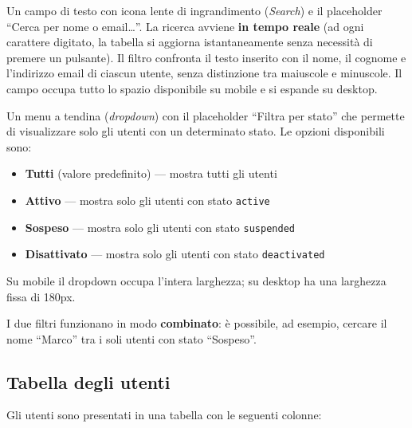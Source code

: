 \documentclass[a4paper,11pt,oneside]{book}
\begin{document}
\begin{description}[leftmargin=1.5em, style=nextline]
  \item[Campo di ricerca] Un campo di testo con icona lente di ingrandimento (\textit{Search}) e il placeholder ``Cerca per nome o email\ldots''. La ricerca avviene \textbf{in tempo reale} (ad ogni carattere digitato, la tabella si aggiorna istantaneamente senza necessit\`a di premere un pulsante). Il filtro confronta il testo inserito con il nome, il cognome e l'indirizzo email di ciascun utente, senza distinzione tra maiuscole e minuscole. Il campo occupa tutto lo spazio disponibile su mobile e si espande su desktop.

  \item[Filtro per stato] Un menu a tendina (\textit{dropdown}) con il placeholder ``Filtra per stato'' che permette di visualizzare solo gli utenti con un determinato stato. Le opzioni disponibili sono:
    \begin{itemize}
      \item \textbf{Tutti} (valore predefinito) --- mostra tutti gli utenti
      \item \textbf{Attivo} --- mostra solo gli utenti con stato \texttt{active}
      \item \textbf{Sospeso} --- mostra solo gli utenti con stato \texttt{suspended}
      \item \textbf{Disattivato} --- mostra solo gli utenti con stato \texttt{deactivated}
    \end{itemize}
    Su mobile il dropdown occupa l'intera larghezza; su desktop ha una larghezza fissa di 180px.
\end{description}

I due filtri funzionano in modo \textbf{combinato}: \`e possibile, ad esempio, cercare il nome ``Marco'' tra i soli utenti con stato ``Sospeso''.

\subsection{Tabella degli utenti}

Gli utenti sono presentati in una tabella con le seguenti colonne:
\end{document}
